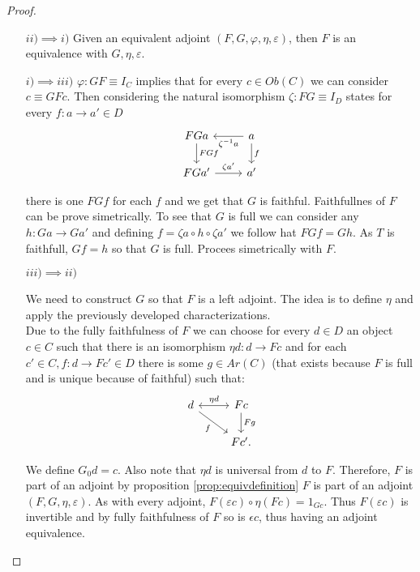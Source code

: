 \begin{proof}\
  \  
  \begin{itemize}
  \item[$ii)\implies i)$] Given an equivalent adjoint $(F,G,\varphi,\eta,\varepsilon)$, then $F$ is an equivalence with $G,\eta,\varepsilon$. 
  \item[$i)\implies iii)$] $\varphi: GF\equiv I_C$ implies that for every $c\in Ob(C)$ we can consider $c\equiv GFc$. Then considering the natural isomorphism $\zeta: FG\equiv I_D$ states for every $f:a\to a'\in D$
    \[
      \begin{tikzcd}
        FGa \arrow{d}{FG f}& a\arrow{d}{f}\arrow{l}{\zeta^{-1} a}\\
        FGa' \arrow{r}{\zeta a'}& a'
      \end{tikzcd}
    \]

    there is one $FG f$ for each $f$ and we get that $G$ is faithful. Faithfullnes of $F$ can be prove simetrically. To see that $G$ is full we can consider any $h:Ga\to Ga'$ and defining $f=\zeta a\circ h \circ \zeta a'$ we follow hat $FG f = Gh$. As $T$ is faithfull, $Gf=h$ so that $G$ is full. Procees simetrically with $F$.  
  \item[$iii)\implies ii)$]


    We need to construct $G$ so that $F$ is a left adjoint. The idea is to define $\eta$ and apply the previously developed characterizations.\\


    Due to the fully faithfulness of $F$ we can choose for every $d\in D$ an object $c\in C$ such that there is an isomorphism $\eta d: d \to Fc$ and for each $c'\in C, f:d\to Fc'\in D$ there is some $g\in Ar(C)$ (that exists because $F$ is full and is unique because of faithful) such that:
    \[
      \begin{tikzcd}
        d\arrow[leftrightarrow]{r}{\eta d}\arrow[swap]{dr}{f}& Fc\arrow{d}{Fg}\\
        & Fc'.
      \end{tikzcd} 
    \]  

    We define $G_0d = c$. Also note  that $\eta d$ is universal from $d$ to $F$. Therefore, $F$ is part of an adjoint by proposition \ref{prop:equivdefinition} $F$ is part of an adjoint $(F,G,\eta, \varepsilon)$. As with every adjoint, $F (\varepsilon c)\circ \eta (Fc) =1_{Gc}$. Thus $F(\varepsilon c)$ is invertible and by  fully faithfulness of $F$ so is $\epsilon c$, thus having an adjoint equivalence.




  \end{itemize}
\end{proof}



